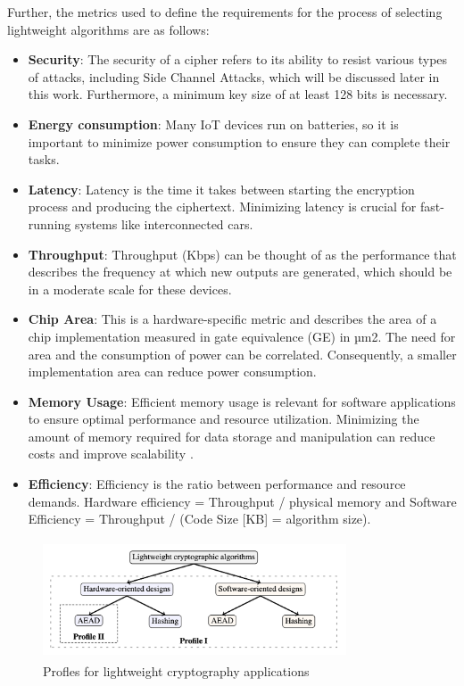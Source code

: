 Further, the metrics used to define the requirements for the process of selecting lightweight algorithms are as follows:

\begin{itemize}
    \setlength{\itemsep}{-5pt}
    \item \textbf{Security}: The security of a cipher refers to its ability to resist various types of attacks, including Side Channel Attacks, which will be discussed later in this work. Furthermore, a minimum key size of at least 128 bits is necessary.
    \item \textbf{Energy consumption}: Many IoT devices run on batteries, so it is important to minimize power consumption to ensure they can complete their tasks.
    \item \textbf{Latency}: Latency is the time it takes between starting the encryption process and producing the ciphertext. Minimizing latency is crucial for fast-running systems like interconnected cars.
    \item \textbf{Throughput}: Throughput (Kbps) can be thought of as the performance that describes the frequency at which new outputs are generated, which should be in a moderate scale for these devices.
    \item \textbf{Chip Area}: This is a hardware-specific metric and describes the area of a chip implementation measured in gate equivalence (GE) in µm2. The need for area and the consumption of power can be correlated. Consequently, a smaller implementation area can reduce power consumption.
    \item \textbf{Memory Usage}: Efficient memory usage is relevant for software applications to ensure optimal performance and resource utilization. Minimizing the amount of memory required for data storage and manipulation can reduce costs and improve scalability \cite{mckay2016report}.
    \item \textbf{Efficiency}: Efficiency is the ratio between performance and resource demands. Hardware efficiency = Throughput / physical memory and Software Efficiency = Throughput / (Code Size [KB] = algorithm size).
\end{itemize}

\begin{figure}[h]
    \centering
    \includegraphics[width=9.0cm, height=3.5cm]{media/profiles.png}
    \caption{Profles for lightweight cryptography applications}
    \label{fig:profiles}
\end{figure}

